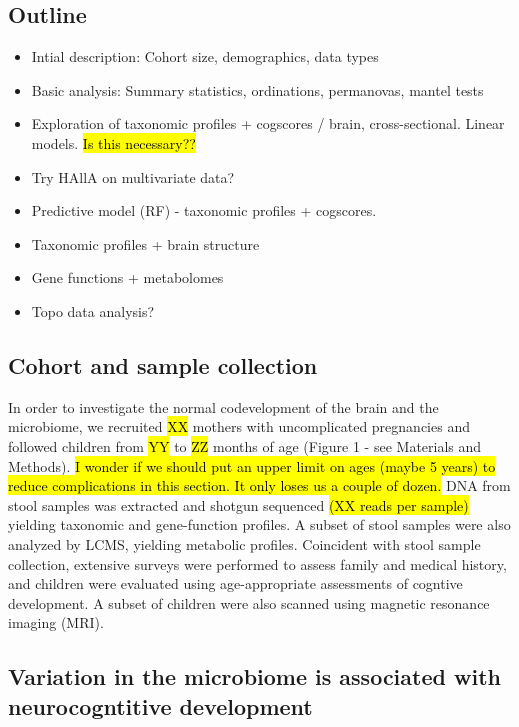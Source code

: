 \subsection*{Outline}

\begin{itemize}
  \item Intial description: Cohort size, demographics, data types
  \item Basic analysis: Summary statistics, ordinations, permanovas, mantel tests
  \item Exploration of taxonomic profiles + cogscores / brain, cross-sectional. Linear models. \hl{Is this necessary??}
  \item Try HAllA on multivariate data?
  \item Predictive model (RF) - taxonomic profiles + cogscores.
  \item Taxonomic profiles + brain structure
  \item Gene functions + metabolomes
  \item Topo data analysis?
\end{itemize}

\subsection*{Cohort and sample collection}

In order to investigate the normal codevelopment of the brain and the microbiome,
we recruited \hl{XX} mothers with uncomplicated pregnancies
and followed children from \hl{YY} to \hl{ZZ} months of age
(Figure 1 - see Materials and Methods).
\hl{I wonder if we should put an upper limit on ages (maybe 5 years)
to reduce complications in this section.
It only loses us a couple of dozen.}
DNA from stool samples was extracted and shotgun sequenced
\hl{(\mu XX reads per sample)}
yielding taxonomic and gene-function profiles.
A subset of stool samples were also analyzed by LCMS,
yielding metabolic profiles.
Coincident with stool sample collection,
extensive surveys were performed to assess family and medical history,
and children were evaluated using age-appropriate assessments
of cogntive development.
A subset of children were also scanned using magnetic resonance imaging (MRI).

\subsection*{Variation in the microbiome is associated with neurocogntitive development}

